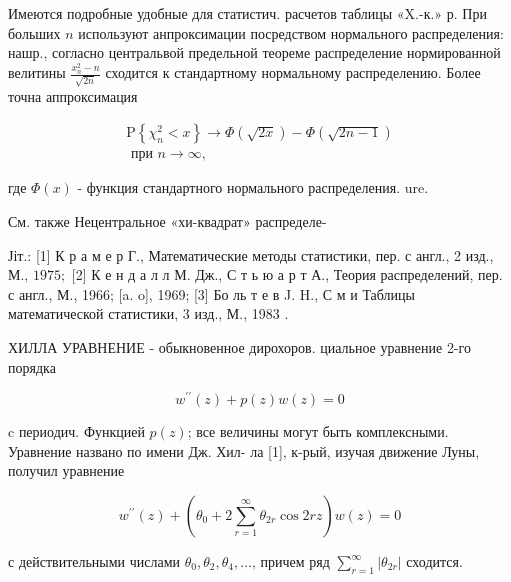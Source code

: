 \documentclass[10pt]{article}
\begin{document}
Имеются подробные удобные для статистич. расчетов таблицы «X.-к.» р. При больших $n$ используют анпроксимации посредством нормального распределения: нашр., согласно центральвой предельной теореме распределение нормированной велитины $\frac{x_{n}^{2}-n}{\sqrt{2 n}}$ сходится к стандартному нормальному распределению. Более точна аппроксимация



\[

\begin{array}{r}

\mathrm{P}\left\{\chi_{n}^{2}<x\right\} \rightarrow \Phi(\sqrt{2 x})-\Phi(\sqrt{2 n-1}) \\

\text { при } n \rightarrow \infty,

\end{array}

\]



где $\Phi(x)$ - функция стандартного нормального распределения. ure.



См. также Нецентральное «хи-квадрат» распределе-



Јіт.: [1] К р а м е р Г., Математические методы статистики, пер. с англ., 2 изд., М., $1975 ;$ [2] К е н д а л л М. Дж., С т ь ю а р т А., Теория распределений, пер. с англ., М., 1966; [a. o], 1969; [3] Бо ль т е в J. H., С м и Таблицы математической статистики, 3 изд., М., 1983 .



ХИЛЛА УРАВНЕНИЕ - обыкновенное дирохоров. циальное уравнение 2-го порядка



\[

w^{\prime \prime}(z)+p(z) w(z)=0

\]



c периодич. Функцией $p(z)$; все величины могут быть комплексными. Уравнение названо по имени Дж. Хил- ла [1], к-рый, изучая движение Луны, получил уравнение



\[

w^{\prime \prime}(z)+\left(\theta_{0}+2 \sum_{r=1}^{\infty} \theta_{2 r} \cos 2 r z\right) w(z)=0

\]



с действительными числами $\theta_{0}, \theta_{2}, \theta_{4}, \ldots$, причем ряд $\sum_{r=1}^{\infty}\left|\theta_{2 r}\right|$ сходится.
\end{document}
